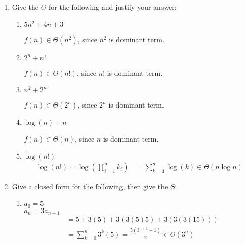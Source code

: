 \documentclass[basic, header]{nosvagor-notes}
\begin{document}
\begin{enumerate}[itemsep=4em]

  \item Give the \(\Theta\) for the following and justify your answer:
    \begin{enumerate}[itemsep=3em]

      \item $5n^2 + 4n + 3$

        \vspace{1em}
        \(f(n) \in \Theta(n^2) \), since \(n^2\) is dominant term.

      \item $2^n + n!$

        \vspace{1em}
        \(f(n) \in \Theta(n!) \), since \(n!\) is dominant term.

      \item $n^2 + 2^n$

        \vspace{1em}
        \(f(n) \in \Theta(2^n) \), since \(2^n\) is dominant term.

      \item $\log(n) + n$

        \vspace{1em}
        \(f(n) \in \Theta(n) \), since \(n\) is dominant term.

      \item $\log(n!)$
        \begin{align*}
          \log(n!)
          = \log\left( \prod_{i=1}^{n} k_i \right)
          &= \sum_{k=1}^{n} \log(k) \in \Theta(n \log n)
        \end{align*}

    \end{enumerate}

  \newpage %

  \item Give a closed form for the following, then give the $\Theta$
     \begin{enumerate}[itemsep=2em]

      \item $a_0 = 5$\\
        $a_n = 3a_{n-1}$
        \begin{align*}
          &= 5 + 3(5) + 3(3(5)5) + 3(3(3(15))) \\
          &= \sum_{k=0}^{n} 3^k(5) = \frac{5(3^{n+1} -1) }{2} \in \Theta(3^n)
        \end{align*}


\end{enumerate}
\end{enumerate}
\end{document}
